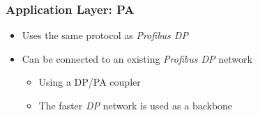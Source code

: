 \documentclass{beamer}
\begin{document}
\begin{frame}
  \frametitle{Application Layer: PA}
  \begin{itemize}
    \item Uses the same protocol as \textit{Profibus DP}
    \item Can be connected to an existing \textit{Profibus DP} network
      \begin{itemize}
        \item Using a DP/PA coupler
        \item The faster \textit{DP} network is used as a backbone
      \end{itemize}
  \end{itemize}
\end{frame}

%
%
\end{document}
